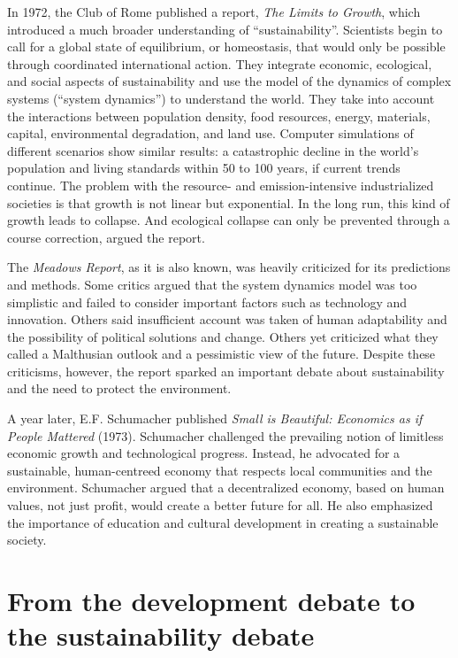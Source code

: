 \documentclass[
  a4paper,
  DIV=11,
  numbers=noendperiod,
  oneside,
  openany]{scrreprt}
\begin{document}
In 1972, the Club of Rome published a report, \emph{The Limits to
Growth}, which introduced a much broader understanding of
``sustainability''. Scientists begin to call for a global state of
equilibrium, or homeostasis, that would only be possible through
coordinated international action. They integrate economic, ecological,
and social aspects of sustainability and use the model of the dynamics
of complex systems (``system dynamics'') to understand the world. They
take into account the interactions between population density, food
resources, energy, materials, capital, environmental degradation, and
land use. Computer simulations of different scenarios show similar
results: a catastrophic decline in the world's population and living
standards within 50 to 100 years, if current trends continue. The
problem with the resource- and emission-intensive industrialized
societies is that growth is not linear but exponential. In the long run,
this kind of growth leads to collapse. And ecological collapse can only
be prevented through a course correction, argued the report.

The \emph{Meadows Report}, as it is also known, was heavily criticized
for its predictions and methods. Some critics argued that the system
dynamics model was too simplistic and failed to consider important
factors such as technology and innovation. Others said insufficient
account was taken of human adaptability and the possibility of political
solutions and change. Others yet criticized what they called a
Malthusian outlook and a pessimistic view of the future. Despite these
criticisms, however, the report sparked an important debate about
sustainability and the need to protect the environment.

A year later, E.F. Schumacher published \emph{Small is Beautiful:
Economics as if People Mattered} (1973). Schumacher challenged the
prevailing notion of limitless economic growth and technological
progress. Instead, he advocated for a sustainable, human-centreed
economy that respects local communities and the environment. Schumacher
argued that a decentralized economy, based on human values, not just
profit, would create a better future for all. He also emphasized the
importance of education and cultural development in creating a
sustainable society.

\section{From the development debate to the sustainability
debate}\label{from-the-development-debate-to-the-sustainability-debate}
\end{document}
